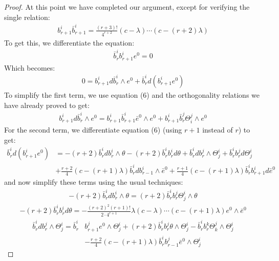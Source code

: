 \begin{proof}
\bigskip

At this point we have completed our argument, except for verifying the single relation:
%
\begin{align*}
b^i_{r+1} \bar{b}^i_{r+1} = \frac{(r+3)!}{4^{r+2}} (c- \lambda) \cdots (c - (r+2) \lambda )
\end{align*}
%
To get this, we differentiate the equation:
%
\begin{align*}
\bar{b}^i_r b^i_{r+1} e^0 = 0
\end{align*}
%
Which becomes:
%
\begin{align*}
0 = b^i_{r+1} d \bar{b}^i_r \wedge e^0 + \bar{b}^i_r d( b^i_{r+1} e^0 )
\end{align*}
%
To simplify the first term, we use equation (6) and the orthogonality relations we have already proved to get:
%
\begin{align*}
b^i_{r+1} d \bar{b}^i_r \wedge e^0 = b^i_{r+1} \bar{b}^i_{r+1} \bar{e}^0 \wedge e^0 + b^i_{r+1} \bar{b}^j_{r} \Theta^j_i \wedge e^0
\end{align*}
%
For the second term, we differentiate equation (6) (using $r+1$ instead of $r$) to get:
%
\begin{align*}
\bar{b}^i_r d( b^i_{r+1} e^0 ) &= - (r+2) \bar{b}^i_r d b^i_r \wedge \theta - (r+2) \bar{b}^i_r b^i_r d \theta + \bar{b}^i_r d b^j_r \wedge \Theta^i_j + \bar{b}^i_r b^j_r d \Theta^i_j \\
&+ \frac{r+2}{4}( c  - (r+1) \lambda ) \bar{b}^i_r d b^i_{r-1} \wedge \bar{e}^0 + \frac{r+1}{4} (c - (r+1) \lambda ) \bar{b}^i_r b^i_{r+1} d \bar{e}^0
\end{align*}
%
and now simplify these terms using the usual techniques:
%
\begin{align*}
- (r+2) \bar{b}^i_r d b^i_r \wedge \theta = (r+2) \bar{b}^i_r b^j_r \Theta^i_j \wedge \theta
\end{align*}
%
\begin{align*}
- (r+2) \bar{b}^i_r b^i_r d \theta = - \frac{(r+2)^2 (r+1)!}{2 \cdot 4^{r+1}} \lambda (c- \lambda) \cdots (c - (r+1) \lambda) e^0 \wedge \bar{e}^0
\end{align*}
%
\begin{align*}
\bar{b}^i_r d b^j_r \wedge \Theta^i_j = \bar{b}^i_r & b^j_{r+1} e^0 \wedge \Theta^i_j + (r+2) \bar{b}^i_r b^j_r \theta \wedge \Theta^i_j - \bar{b}^i_r b^k_r \Theta^j_k \wedge \Theta^i_j \\
&- \frac{r+2}{4} (c - (r + 1) \lambda ) \bar{b}^i_r b^j_{r-1} \bar{e}^0 \wedge \Theta^i_j
\end{align*}

\end{proof}
